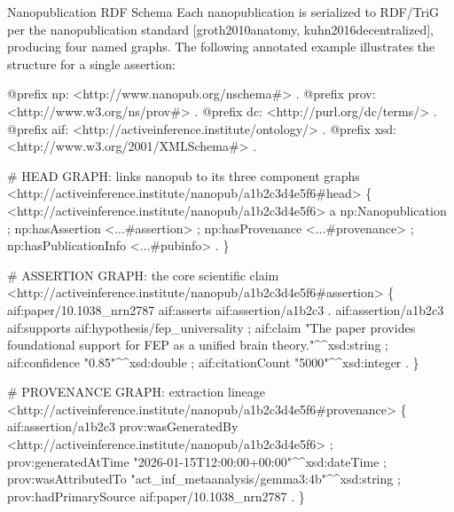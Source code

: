 \documentclass[
  ignorenonframetext,
]{beamer}
\newenvironment{Shaded}{}{}
\newcommand{\NormalTok}[1]{#1}
\providecommand{\citep}[1]{[#1]}
\begin{document}
\begin{frame}{Nanopublication RDF Schema
\label{sec:appendix_rdf}}
\protect{}\label{nanopublication-rdf-schema}
Each nanopublication is serialized to RDF/TriG per the nanopublication
standard \citep{groth2010anatomy, kuhn2016decentralized}, producing four
named graphs. The following annotated example illustrates the structure
for a single assertion:

\begin{Shaded}
\begin{Highlighting}[]
\NormalTok{@prefix np:   \textless{}http://www.nanopub.org/nschema\#\textgreater{} .}
\NormalTok{@prefix prov: \textless{}http://www.w3.org/ns/prov\#\textgreater{} .}
\NormalTok{@prefix dc:   \textless{}http://purl.org/dc/terms/\textgreater{} .}
\NormalTok{@prefix aif:  \textless{}http://activeinference.institute/ontology/\textgreater{} .}
\NormalTok{@prefix xsd:  \textless{}http://www.w3.org/2001/XMLSchema\#\textgreater{} .}

\NormalTok{\# HEAD GRAPH: links nanopub to its three component graphs}
\NormalTok{\textless{}http://activeinference.institute/nanopub/a1b2c3d4e5f6\#head\textgreater{} \{}
\NormalTok{  \textless{}http://activeinference.institute/nanopub/a1b2c3d4e5f6\textgreater{}}
\NormalTok{    a np:Nanopublication ;}
\NormalTok{    np:hasAssertion       \textless{}...\#assertion\textgreater{} ;}
\NormalTok{    np:hasProvenance      \textless{}...\#provenance\textgreater{} ;}
\NormalTok{    np:hasPublicationInfo \textless{}...\#pubinfo\textgreater{} .}
\NormalTok{\}}

\NormalTok{\# ASSERTION GRAPH: the core scientific claim}
\NormalTok{\textless{}http://activeinference.institute/nanopub/a1b2c3d4e5f6\#assertion\textgreater{} \{}
\NormalTok{  aif:paper/10.1038\_nrn2787 aif:asserts aif:assertion/a1b2c3 .}
\NormalTok{  aif:assertion/a1b2c3}
\NormalTok{    aif:supports       aif:hypothesis/fep\_universality ;}
\NormalTok{    aif:claim          "The paper provides foundational support for FEP as a}
\NormalTok{                        unified brain theory."\^{}\^{}xsd:string ;}
\NormalTok{    aif:confidence     "0.85"\^{}\^{}xsd:double ;}
\NormalTok{    aif:citationCount  "5000"\^{}\^{}xsd:integer .}
\NormalTok{\}}

\NormalTok{\# PROVENANCE GRAPH: extraction lineage}
\NormalTok{\textless{}http://activeinference.institute/nanopub/a1b2c3d4e5f6\#provenance\textgreater{} \{}
\NormalTok{  aif:assertion/a1b2c3}
\NormalTok{    prov:wasGeneratedBy   \textless{}http://activeinference.institute/nanopub/a1b2c3d4e5f6\textgreater{} ;}
\NormalTok{    prov:generatedAtTime  "2026{-}01{-}15T12:00:00+00:00"\^{}\^{}xsd:dateTime ;}
\NormalTok{    prov:wasAttributedTo  "act\_inf\_metaanalysis/gemma3:4b"\^{}\^{}xsd:string ;}
\NormalTok{    prov:hadPrimarySource aif:paper/10.1038\_nrn2787 .}
\NormalTok{\}}


\end{Highlighting}
\end{Shaded}
\end{frame}
\end{document}
